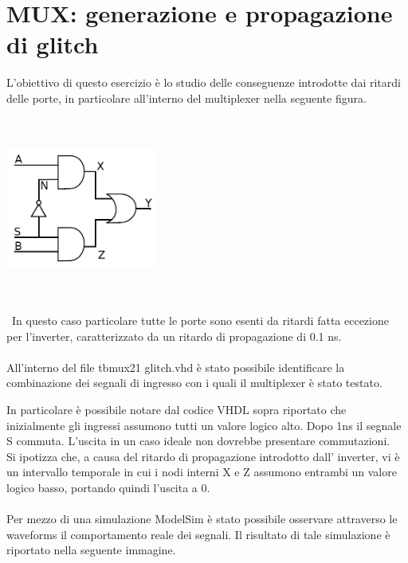\documentclass[11pt,  english, makeidx, a4paper, titlepage, oneside]{book}
\newenvironment{listato}{\footnotesize} {\normalsize }
\begin{document}
\section{MUX: generazione e propagazione di glitch}
L'obiettivo di questo esercizio è lo studio delle conseguenze 
introdotte dai ritardi delle porte, in particolare all'interno del
multiplexer nella seguente figura.
\\\\\
\centerline{\includegraphics[width=5cm]{./img/Lab_1/Es_4/Mux.png}}
\\\\\
In questo caso particolare tutte le porte sono esenti da ritardi fatta
eccezione per l'inverter, caratterizzato da un ritardo di propagazione
di 0.1 ns.
\\\\
All'interno del file tb\textunderscore mux21\textunderscore
glitch.vhd è stato possibile identificare la combinazione 
dei segnali di ingresso con i quali il multiplexer è stato
testato.
\begin{center}
\begin{listato}
	\centerline{}
\end{listato}
\end{center}
In particolare è possibile notare dal codice VHDL sopra riportato
che inizialmente gli ingressi assumono tutti un valore logico alto.
Dopo 1ns il segnale S commuta. L'uscita in un caso ideale non dovrebbe
presentare commutazioni.
\\
Si ipotizza che, a causa del ritardo di propagazione introdotto dall'
inverter, vi è un intervallo temporale in cui i nodi interni X e Z 
assumono entrambi un valore logico basso, portando quindi l'uscita a 0.
\\\\
Per mezzo di una simulazione ModelSim è stato possibile osservare
attraverso le waveforms il comportamento reale dei segnali. Il risultato
di tale simulazione è riportato nella seguente immagine.\\
\\\\
\end{document}
